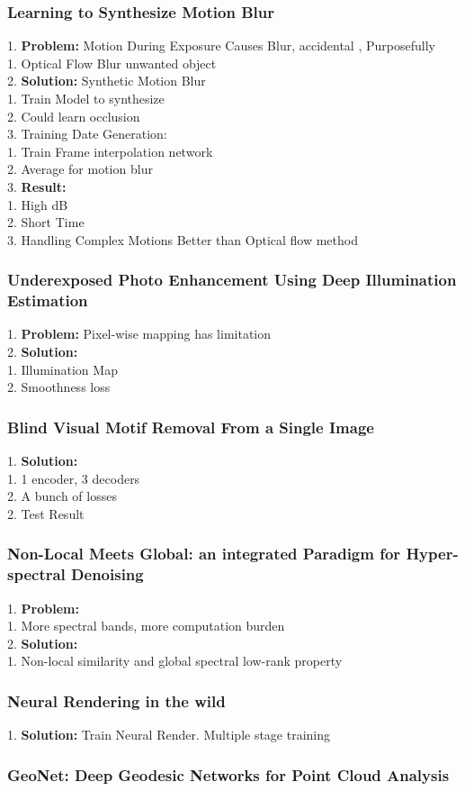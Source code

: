\subsubsection{Learning to Synthesize Motion Blur}
    1. {\bf Problem:} Motion During Exposure Causes Blur, accidental , Purposefully  \\
        1. Optical Flow Blur unwanted object  \\
    2. {\bf Solution:} Synthetic Motion Blur \\
        1. Train Model to synthesize \\
        2. Could learn occlusion \\
        3. Training Date Generation: \\
            1. Train Frame interpolation network \\
            2. Average for motion blur \\
    3. {\bf Result:} \\
        1. High dB \\
        2. Short Time \\
        3. Handling Complex Motions Better than Optical flow method \\
\subsubsection{Underexposed Photo Enhancement Using Deep Illumination Estimation}
    1. {\bf Problem:} Pixel-wise mapping has limitation \\
    2. {\bf Solution:}  \\
        1. Illumination Map \\
        2. Smoothness loss \\
\subsubsection{Blind Visual Motif Removal From a Single Image}
    1. {\bf Solution:}  \\
        1. 1 encoder, 3 decoders \\
        2. A bunch of losses \\
    2. Test Result \\
\subsubsection{Non-Local Meets Global: an integrated Paradigm for Hyper-spectral Denoising}
    1. {\bf Problem:}  \\
        1. More spectral bands, more computation burden \\
    2. {\bf Solution:}  \\
        1. Non-local similarity and global spectral low-rank property \\
\subsubsection{Neural Rendering in the wild}
    1. {\bf Solution:} Train Neural Render. Multiple stage training \\
\subsubsection{GeoNet: Deep Geodesic Networks for Point Cloud Analysis}